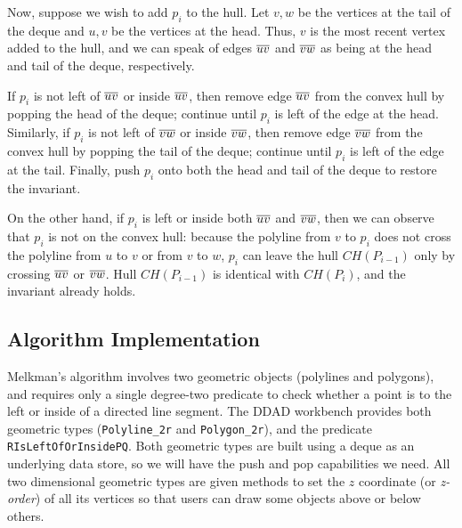 Now, suppose we wish to add $p_i$ to the hull. Let $v, w$ be the vertices at the
tail of the deque and $u, v$ be the vertices at the head. Thus, $v$ is the most
recent vertex added to the hull, and we can speak of edges $\seg{uv}$ and
$\seg{vw}$ as being at the head and tail of the deque, respectively. 

If $p_i$ is not left of $\seg{uv}$ or inside $\seg{uv}$, then remove edge
$\seg{uv}$ from the convex hull by popping the head of the deque; continue until
$p_i$ is left of the edge at the head. Similarly, if $p_i$ is not left of
$\seg{vw}$ or inside $\seg{vw}$, then remove edge $\seg{vw}$ from the convex
hull by popping the tail of the deque; continue until $p_i$ is left of the edge
at the tail. Finally, push $p_i$ onto both the head and tail of the deque to
restore the invariant.

On the other hand, if $p_i$ is left or inside both $\seg{uv}$ and $\seg{vw}$,
then we can observe that $p_i$ is not on the convex hull: because the polyline
from $v$ to $p_i$ does not cross the polyline from $u$ to $v$ or from $v$ to
$w$, $p_i$ can leave the hull $CH(P_{i-1})$ only by crossing $\seg{uv}$ or
$\seg{vw}$. Hull $CH(P_{i-1})$ is identical with $CH(P_i)$, and the invariant
already holds.



\subsection{Algorithm Implementation}

Melkman's algorithm involves two geometric objects (polylines and polygons), and
requires only a single degree-two predicate to check whether a point is to the
left or inside of a directed line segment. The DDAD workbench provides both
geometric types (\texttt{Polyline\_2r} and \texttt{Polygon\_2r}), and the
predicate \texttt{RIsLeftOfOrInsidePQ}. Both geometric types are built using a
deque as an underlying data store, so we will have the push and pop
capabilities we need. All two dimensional geometric types are given methods to
set the $z$ coordinate (or \emph{z-order}) of all its vertices so that users can
draw some objects above or below others. 

